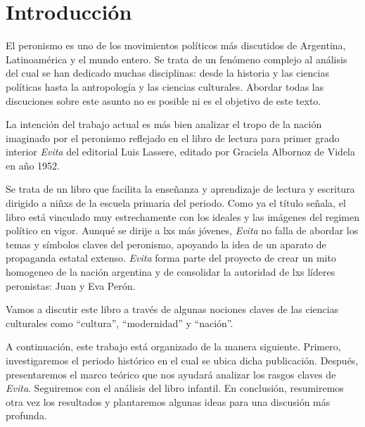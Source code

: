 \section{Introducción}
El peronismo es uno de los movimientos políticos más discutidos de Argentina, Latinoamérica y el mundo entero.
Se trata de un fenómeno complejo al análisis del cual se han dedicado muchas disciplinas: desde la historia y las ciencias políticas hasta la antropología y las ciencias culturales.
Abordar todas las discuciones sobre este asunto no es posible ni es el objetivo de este texto.

La intención del trabajo actual es más bien analizar el tropo de la nación imaginado por el peronismo reflejado en el libro de lectura para primer grado interior \textit{Evita} del editorial Luis Lassere, editado por Graciela Albornoz de Videla en año 1952.

Se trata de un libro que facilita la enseñanza y aprendizaje de lectura y escritura dirigido a niñxs de la escuela primaria del periodo.
Como ya el título señala, el libro está vinculado muy estrechamente con los ideales y las imágenes del regimen político en vigor.
Aunqué se dirije a lxs más jóvenes, \textit{Evita} no falla de abordar los temas y símbolos claves del peronismo, apoyando la idea de un aparato de propaganda estatal extenso.
\textit{Evita} forma parte del proyecto de crear un mito homogeneo de la nación argentina
y de consolidar la autoridad de lxs líderes peronistas: Juan y Eva Perón.

Vamos a discutir este libro a través de algunas nociones claves de las ciencias culturales como ``cultura'', ``modernidad'' y ``nación''.

A continuación, este trabajo está organizado de la manera siguiente.
Primero, investigaremos el periodo histórico en el cual se ubica dicha publicación.
Después, presentaremos el marco teórico que nos ayudará analizar los rasgos claves de \textit{Evita}.
Seguiremos con el análisis del libro infantil.
En conclusión, resumiremos otra vez los resultados y plantaremos algunas ideas para una discusión más profunda.
